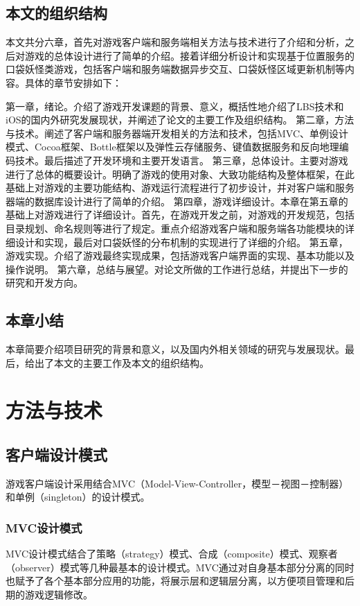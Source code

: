 \documentclass{article}
\begin{document}
\begin{CJK}{UTF8}{gbsn}
	\subsection{本文的组织结构}
  本文共分六章，首先对游戏客户端和服务端相关方法与技术进行了介绍和分析，之后对游戏的总体设计进行了简单的介绍。接着详细分析设计和实现基于位置服务的口袋妖怪类游戏，包括客户端和服务端数据异步交互、口袋妖怪区域更新机制等内容。具体的章节安排如下：

  第一章，绪论。介绍了游戏开发课题的背景、意义，概括性地介绍了LBS技术和iOS的国内外研究发展现状，并阐述了论文的主要工作及组织结构。
  第二章，方法与技术。阐述了客户端和服务器端开发相关的方法和技术，包括MVC、单例设计模式、Cocoa框架、Bottle框架以及弹性云存储服务、键值数据服务和反向地理编码技术。最后描述了开发环境和主要开发语言。
  第三章，总体设计。主要对游戏进行了总体的概要设计。明确了游戏的使用对象、大致功能结构及整体框架，在此基础上对游戏的主要功能结构、游戏运行流程进行了初步设计，并对客户端和服务器端的数据库设计进行了简单的介绍。
  第四章，游戏详细设计。本章在第五章的基础上对游戏进行了详细设计。首先，在游戏开发之前，对游戏的开发规范，包括目录规划、命名规则等进行了规定。重点介绍游戏客户端和服务端各功能模块的详细设计和实现，最后对口袋妖怪的分布机制的实现进行了详细的介绍。
  第五章，游戏实现。介绍了游戏最终实现成果，包括游戏客户端界面的实现、基本功能以及操作说明。
  第六章，总结与展望。对论文所做的工作进行总结，并提出下一步的研究和开发方向。

	\subsection{本章小结}
  本章简要介绍项目研究的背景和意义，以及国内外相关领域的研究与发展现状。最后，给出了本文的主要工作及本文的组织结构。


  \section{方法与技术}
	\subsection{客户端设计模式}
  游戏客户端设计采用结合MVC（Model-View-Controller，模型－视图－控制器）和单例（singleton）的设计模式。

	\subsubsection{MVC设计模式}
  MVC设计模式结合了策略（strategy）模式、合成（composite）模式、观察者（observer）模式等几种最基本的设计模式。MVC通过对自身基本部分分离的同时也赋予了各个基本部分应用的功能，将展示层和逻辑层分离，以方便项目管理和后期的游戏逻辑修改。


\end{CJK}
\end{document}
